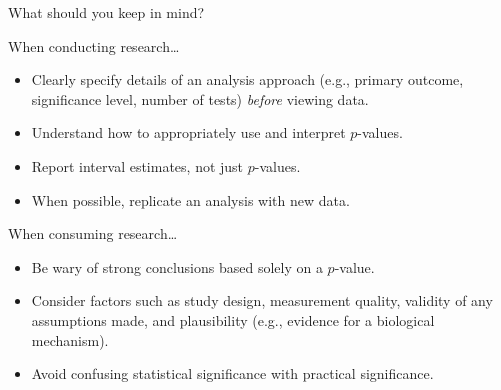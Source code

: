 \documentclass[
  ignorenonframetext,
  aspectratio=169]{beamer}
\begin{document}
\begin{frame}{What should you keep in mind?}
\protect\hypertarget{what-should-you-keep-in-mind}{}
\small

When conducting research\ldots{}

\begin{itemize}
\item
  Clearly specify details of an analysis approach (e.g., primary
  outcome, significance level, number of tests) \emph{before} viewing
  data.
\item
  Understand how to appropriately use and interpret \(p\)-values.
\item
  Report interval estimates, not just \(p\)-values.
\item
  When possible, replicate an analysis with new data.
\end{itemize}

When consuming research\ldots{}

\begin{itemize}
\item
  Be wary of strong conclusions based solely on a \(p\)-value.
\item
  Consider factors such as study design, measurement quality, validity
  of any assumptions made, and plausibility (e.g., evidence for a
  biological mechanism).
\item
  Avoid confusing statistical significance with practical significance.
\end{itemize}
\end{frame}
\end{document}
